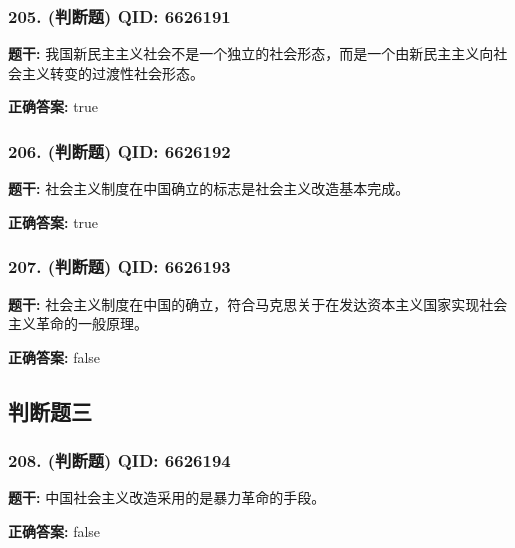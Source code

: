 \documentclass[12pt,UTF8]{ctexart}
\begin{document}
\subsubsection*{205. (判断题) \small QID: 6626191}

\textbf{题干:}
我国新民主主义社会不是一个独立的社会形态，而是一个由新民主主义向社会主义转变的过渡性社会形态。

\textbf{正确答案:}
true

\vspace{0.3em}\hrulefill\vspace{0.7em}

\subsubsection*{206. (判断题) \small QID: 6626192}

\textbf{题干:}
社会主义制度在中国确立的标志是社会主义改造基本完成。

\textbf{正确答案:}
true

\vspace{0.3em}\hrulefill\vspace{0.7em}

\subsubsection*{207. (判断题) \small QID: 6626193}

\textbf{题干:}
社会主义制度在中国的确立，符合马克思关于在发达资本主义国家实现社会主义革命的一般原理。

\textbf{正确答案:}
false

\vspace{0.3em}\hrulefill\vspace{0.7em}

\subsection*{判断题三}

\subsubsection*{208. (判断题) \small QID: 6626194}

\textbf{题干:}
中国社会主义改造采用的是暴力革命的手段。

\textbf{正确答案:}
false

\vspace{0.3em}\hrulefill\vspace{0.7em}
\end{document}
